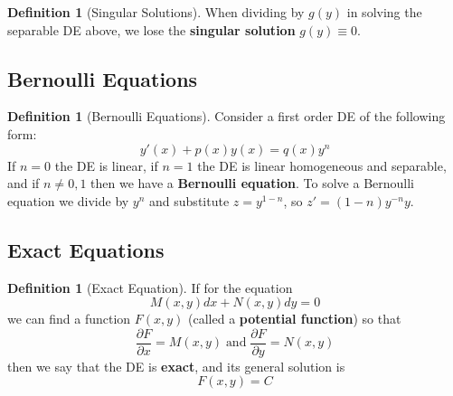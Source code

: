 \documentclass[12pt]{article}
\theoremstyle{definition}
\newtheorem{defn}[thm]{Definition}
\theoremstyle{remark}
\numberwithin{equation}{section}
\newcommand\B[1]{\textbf{ #1}}
\begin{document}
\vspace{1cm}


\begin{defn}[Singular Solutions]
        When dividing by $g(y)$ in solving the separable DE above, we lose the \B{singular solution} $g(y) \equiv 0$.
\end{defn}


\vspace{1cm}

\subsection{Bernoulli Equations}

\begin{defn}[Bernoulli Equations]
        Consider a first order DE of the following form: \begin{equation}
                y'(x) + p(x)y(x) = q(x)y^n
        \end{equation}
        If $n = 0$ the DE is linear, if $n = 1$ the DE is linear homogeneous and separable, and if $n \neq 0, 1$ then we have a \B{Bernoulli equation}. To solve a Bernoulli equation we divide by $y^{n}$ and substitute $z = y^{1-n}$, so $z' =(1-n)y^{-n}y
        $.
\end{defn}


\vspace{1cm}

\subsection{Exact Equations}


\begin{defn}[Exact Equation]
        If for the equation \begin{equation}
                M(x,y)dx + N(x,y)dy = 0
        \end{equation}
        we can find a function $F(x,y)$ (called a \B{potential function}) so that \begin{equation}
                \frac{\partial F}{\partial x} = M(x,y)\;\text{and}\;\frac{\partial F}{\partial y} = N(x,y)
        \end{equation}
        then we say that the DE is \B{exact}, and its general solution is \begin{equation}
                F(x,y) = C
        \end{equation}
\end{defn}


\vspace{1cm}
\end{document}
